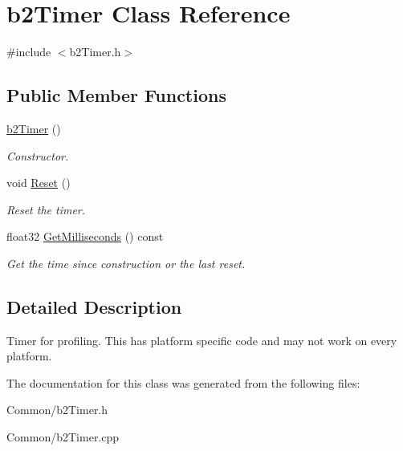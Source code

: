 \hypertarget{classb2Timer}{}\section{b2\+Timer Class Reference}
\label{classb2Timer}


{\ttfamily \#include $<$b2\+Timer.\+h$>$}

\subsection*{Public Member Functions}
\begin{DoxyCompactItemize}
\item 
\mbox{\label{classb2Timer_afcc159032a8edeaa9febdf2b6cbd49a5}} 
\mbox{\hyperlink{classb2Timer_afcc159032a8edeaa9febdf2b6cbd49a5}{b2\+Timer}} ()
\begin{DoxyCompactList}\small\item\em Constructor. \end{DoxyCompactList}\item 
\mbox{\label{classb2Timer_a367388794588e9283600437be82f2889}} 
void \mbox{\hyperlink{classb2Timer_a367388794588e9283600437be82f2889}{Reset}} ()
\begin{DoxyCompactList}\small\item\em Reset the timer. \end{DoxyCompactList}\item 
\mbox{\label{classb2Timer_a15fd1aaa83a9d58cc004c852df71abb3}} 
float32 \mbox{\hyperlink{classb2Timer_a15fd1aaa83a9d58cc004c852df71abb3}{Get\+Milliseconds}} () const
\begin{DoxyCompactList}\small\item\em Get the time since construction or the last reset. \end{DoxyCompactList}\end{DoxyCompactItemize}


\subsection{Detailed Description}
Timer for profiling. This has platform specific code and may not work on every platform. 

The documentation for this class was generated from the following files\+:\begin{DoxyCompactItemize}
\item 
Common/b2\+Timer.\+h\item 
Common/b2\+Timer.\+cpp\end{DoxyCompactItemize}

